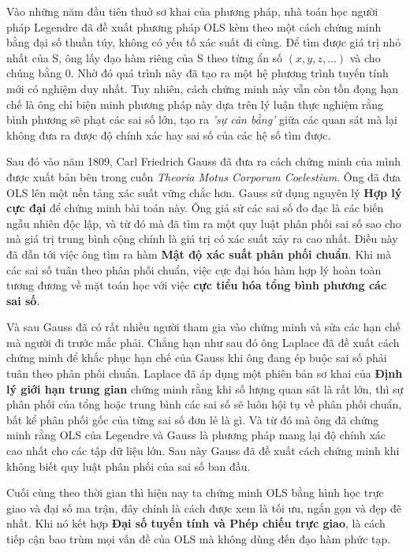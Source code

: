 Vào những năm đầu tiên thuở sơ khai của phương pháp, nhà toán học người pháp Legendre đã đề xuất phương pháp OLS kèm theo một cách chứng minh bằng đại số thuần túy, không có yếu tố xác suất đi cùng. Để tìm được giá trị nhỏ nhất của S, ông lấy đạo hàm riêng của S theo từng ẩn số $(x, y, z, ...)$ và cho chúng bằng $0$. Nhờ đó quá trình này đã tạo ra một hệ phương trình tuyến tính mới có nghiệm duy nhất. Tuy nhiên, cách chứng minh này vẫn còn tồn đọng hạn chế là ông chỉ biện minh phương pháp này dựa trên lý luận thực nghiệm rằng bình phương sẽ phạt các sai số lớn, tạo ra \textit{'sự cân bằng'} giữa các quan sát \cite{plackett1972} mà lại không đưa ra được độ chính xác hay sai số của các hệ số tìm được.

Sau đó vào năm 1809, Carl Friedrich Gauss đã đưa ra cách chứng minh của mình được xuất bản bên trong cuốn \textit{Theoria Motus Corporum Coelestium}. Ông đã đưa OLS lên một nền tảng xác suất vững chắc hơn. Gauss sử dụng nguyên lý \textbf{Hợp lý cực đại} để chứng minh bài toán này. Ông giả sử các sai số đo đạc là các biến ngẫu nhiên độc lập, và từ đó mà đã tìm ra một quy luật phân phối sai số sao cho mà giá trị trung bình cộng chính là giá trị có xác suất xảy ra cao nhất. Điều này đã dẫn tới việc ông tìm ra hàm \textbf{Mật độ xác suất phân phối chuẩn}. Khi mà các sai số tuân theo phân phối chuẩn, việc cực đại hóa hàm hợp lý hoàn toàn tương đương về mặt toán học với việc \textbf{cực tiểu hóa tổng bình phương các sai số}.

Và sau Gauss đã có rất nhiều người tham gia vào chứng minh và sửa các hạn chế mà người đi trước mắc phải. Chẳng hạn như sau đó ông Laplace đã đề xuất cách chứng minh để khắc phục hạn chế của Gauss khi ông đang ép buộc sai số phải tuân theo phân phối chuẩn. Laplace đã áp dụng một phiên bản sơ khai của \textbf{Định lý giới hạn trung gian} chứng minh rằng khi số lượng quan sát là rất lớn, thì sự phân phối của tổng hoặc trung bình các sai số sẽ luôn hội tụ về phân phối chuẩn, bất kể phân phối gốc của từng sai số đơn lẻ là gì. Và từ đó mà ông đã chứng minh rằng OLS của Legendre và Gauss là phương pháp mang lại độ chính xác cao nhất cho các tập dữ liệu lớn. Sau này Gauss đã đề xuất cách chứng minh khi không biết quy luật phân phối của sai số ban đầu.

Cuối cùng theo thời gian thì hiện nay ta chứng minh OLS bằng hình học trực giao và đại số ma trận, đây chính là cách được xem là tối ưu, ngắn gọn và đẹp đẽ nhất. Khi nó kết hợp \textbf{Đại số tuyến tính và Phép chiếu trực giao}, là cách tiếp cận bao trùm mọi vấn đề của OLS mà không dùng đến đạo hàm phức tạp.

